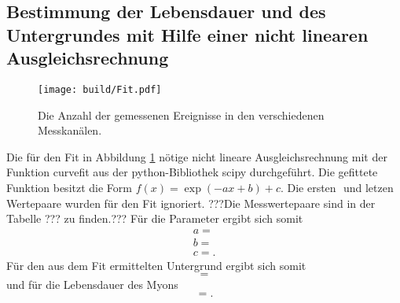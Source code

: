 \subsection{Bestimmung der Lebensdauer und des Untergrundes mit Hilfe einer nicht linearen Ausgleichsrechnung}
\begin{figure}
	\centering
	\texttt{[image: build/Fit.pdf]}
	\caption{Die Anzahl der gemessenen Ereignisse in den verschiedenen Messkanälen.}
	\label{fig:zweite}
\end{figure}
Die für den Fit in Abbildung \ref{fig:zweite} nötige nicht lineare Ausgleichsrechnung mit der Funktion curvefit aus der python-Bibliothek scipy \cite{scipy} durchgeführt. Die gefittete Funktion besitzt die Form $f(x)=\exp(-a x +b)+c$. Die ersten $ $ und letzen $ $ Wertepaare wurden für den Fit ignoriert. ???Die Messwertepaare sind in der Tabelle ??? zu finden.??? Für die Parameter ergibt sich somit
\begin{gather*}
a=\num{}\\
b=\num{}\\
c=\num{}.
\end{gather*}
Für den aus dem Fit ermittelten Untergrund ergibt sich somit
\begin{displaymath}
	=\num{}
\end{displaymath}
und für die Lebensdauer des Myons
\begin{displaymath}
	=\num{}.
\end{displaymath}